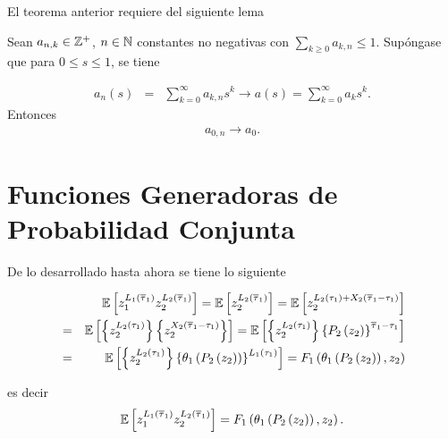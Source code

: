 El teorema anterior requiere del siguiente lema

\begin{Lemma}
Sean $a_{n,k}\in\mathbb{Z}^{+}$, $n\in\mathbb{N}$ constantes no negativas con
$\sum_{k\geq0}a_{k,n}\leq1$. Sup\'ongase que para $0\leq s\leq1$,
se tiene

\begin{eqnarray*}
a_{n}\left(s\right)&=&\sum_{k=0}^{\infty}a_{k,n}s^{k}\rightarrow
a\left(s\right)=\sum_{k=0}^{\infty}a_{k}s^{k}.
\end{eqnarray*}
Entonces
\begin{eqnarray*}
a_{0,n}\rightarrow a_{0}.
\end{eqnarray*}
\end{Lemma}


\section{Funciones Generadoras de Probabilidad Conjunta}


De lo desarrollado hasta ahora se tiene lo siguiente

\begin{eqnarray*}
&&\mathbb{E}\left[z_{1}^{L_{1}\left(\overline{\tau}_{1}\right)}z_{2}^{L_{2}\left(\overline{\tau}_{1}\right)}\right]=\mathbb{E}\left[z_{2}^{L_{2}\left(\overline{\tau}_{1}\right)}\right]=\mathbb{E}\left[z_{2}^{L_{2}\left(\tau_{1}\right)+X_{2}\left(\overline{\tau}_{1}-\tau_{1}\right)}\right]\\
&=&\mathbb{E}\left[\left\{z_{2}^{L_{2}\left(\tau_{1}\right)}\right\}\left\{z_{2}^{X_{2}\left(\overline{\tau}_{1}-\tau_{1}\right)}\right\}\right]=\mathbb{E}\left[\left\{z_{2}^{L_{2}\left(\tau_{1}\right)}\right\}\left\{P_{2}\left(z_{2}\right)\right\}^{\overline{\tau}_{1}-\tau_{1}}\right]\\
&=&\mathbb{E}\left[\left\{z_{2}^{L_{2}\left(\tau_{1}\right)}\right\}\left\{\theta_{1}\left(P_{2}\left(z_{2}\right)\right)\right\}^{L_{1}\left(\tau_{1}\right)}\right]=F_{1}\left(\theta_{1}\left(P_{2}\left(z_{2}\right)\right),z_{2}\right)
\end{eqnarray*}

es decir %
\begin{equation}\label{Eq.base.F1}
\mathbb{E}\left[z_{1}^{L_{1}\left(\overline{\tau}_{1}\right)}z_{2}^{L_{2}\left(\overline{\tau}_{1}\right)}\right]=F_{1}\left(\theta_{1}\left(P_{2}\left(z_{2}\right)\right),z_{2}\right).
\end{equation}

